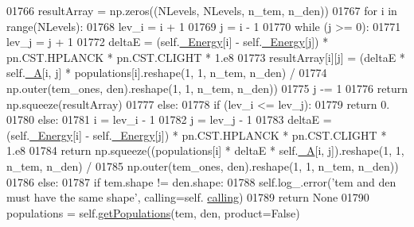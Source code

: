 \begin{DoxyCode}
01766                 resultArray = np.zeros((NLevels, NLevels, n\_tem, n\_den))
01767                 \textcolor{keywordflow}{for} i \textcolor{keywordflow}{in} range(NLevels):
01768                     lev\_i = i + 1
01769                     j = i - 1 
01770                     \textcolor{keywordflow}{while} (j >= 0):
01771                         lev\_j = j + 1
01772                         deltaE = (self.\hyperlink{classpyneb_1_1core_1_1pynebcore_1_1_atom_a52e68715246d258bf0a14f4bd06e89e4}{\_Energy}[i] - self.\hyperlink{classpyneb_1_1core_1_1pynebcore_1_1_atom_a52e68715246d258bf0a14f4bd06e89e4}{\_Energy}[j]) * pn.CST.HPLANCK * 
      pn.CST.CLIGHT * 1.e8 
01773                         resultArray[i][j] = (deltaE * self.\hyperlink{classpyneb_1_1core_1_1pynebcore_1_1_atom_aa6416fe661b8deaa008179314727e025}{\_A}[i, j] * populations[i].reshape(1, 1, n\_tem,
       n\_den) / 
01774                                              np.outer(tem\_ones, den).reshape(1, 1, n\_tem, n\_den))
01775                         j -= 1
01776                 \textcolor{keywordflow}{return} np.squeeze(resultArray)
01777             \textcolor{keywordflow}{else}:
01778                 \textcolor{keywordflow}{if} (lev\_i <= lev\_j):
01779                     \textcolor{keywordflow}{return} 0.
01780                 \textcolor{keywordflow}{else}:
01781                     i = lev\_i - 1
01782                     j = lev\_j - 1
01783                     deltaE = (self.\hyperlink{classpyneb_1_1core_1_1pynebcore_1_1_atom_a52e68715246d258bf0a14f4bd06e89e4}{\_Energy}[i] - self.\hyperlink{classpyneb_1_1core_1_1pynebcore_1_1_atom_a52e68715246d258bf0a14f4bd06e89e4}{\_Energy}[j]) * pn.CST.HPLANCK * 
      pn.CST.CLIGHT * 1.e8 
01784                     \textcolor{keywordflow}{return} np.squeeze((populations[i] * deltaE * self.\hyperlink{classpyneb_1_1core_1_1pynebcore_1_1_atom_aa6416fe661b8deaa008179314727e025}{\_A}[i, j]).reshape(1, 1, n\_tem, 
      n\_den) / 
01785                                       np.outer(tem\_ones, den).reshape(1, 1, n\_tem, n\_den))
01786         \textcolor{keywordflow}{else}:
01787             \textcolor{keywordflow}{if} tem.shape != den.shape:
01788                 self.log\_.error(\textcolor{stringliteral}{'tem and den must have the same shape'}, calling=self.
      \hyperlink{classpyneb_1_1core_1_1pynebcore_1_1_atom_a373b7735acf4f528b54bddf373ad67a1}{calling})
01789                 \textcolor{keywordflow}{return} \textcolor{keywordtype}{None}
01790             populations = self.\hyperlink{classpyneb_1_1core_1_1pynebcore_1_1_atom_aab7496403c8aaef40ab3b20b5c00e9f0}{getPopulations}(tem, den, product=\textcolor{keyword}{False})

\end{DoxyCode}
